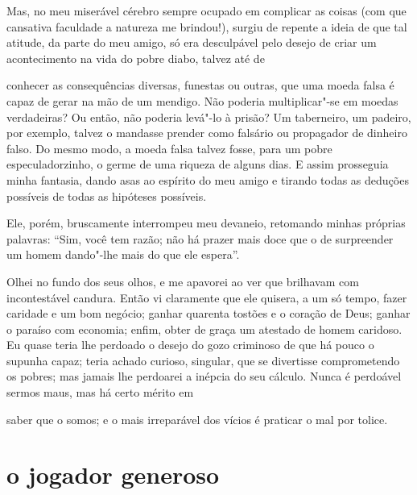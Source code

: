 Mas, no meu miserável cérebro sempre ocupado em complicar as coisas (com
que cansativa faculdade a natureza me brindou!),
surgiu de repente a ideia de que tal atitude, da parte do meu amigo, só
era desculpável pelo desejo de criar um acontecimento na vida do
pobre diabo, talvez até de \linebreak

\quebra

\noindent{}conhecer as consequências diversas, funestas
ou outras, que uma moeda falsa é capaz de gerar na mão de um mendigo. Não
poderia multiplicar"-se em moedas verdadeiras? Ou então, não poderia
levá"-lo à prisão? Um taberneiro, um padeiro, por exemplo, talvez o
mandasse prender como falsário ou propagador de dinheiro falso. Do
mesmo modo, a moeda falsa talvez fosse, para um pobre especuladorzinho,
o germe de uma riqueza de alguns dias. E assim prosseguia minha
fantasia, dando asas ao espírito do meu amigo e tirando todas as
deduções possíveis de todas as hipóteses possíveis.

Ele, porém, bruscamente interrompeu meu devaneio, retomando minhas
próprias palavras: “Sim, você tem razão; não há prazer
mais doce que o de surpreender um homem dando"-lhe mais do que ele
espera''.

Olhei no fundo dos seus olhos, e me apavorei ao ver que
brilhavam com incontestável candura. Então vi claramente que ele
quisera, a um só tempo, fazer caridade e um bom negócio; ganhar quarenta
tostões e o coração de Deus; ganhar o paraíso com economia; enfim,
obter de graça um atestado de homem caridoso. Eu quase teria lhe
perdoado o desejo do gozo criminoso de que há pouco o supunha capaz;
teria achado curioso, singular, que se divertisse comprometendo
os pobres; mas jamais lhe perdoarei a inépcia do seu cálculo. Nunca é
perdoável sermos maus, mas há certo mérito em \linebreak

\quebra

\noindent{}saber que o somos; e o
mais irreparável dos vícios é praticar o mal por tolice.

\quebra\section[O jogador generoso]{o jogador generoso}


